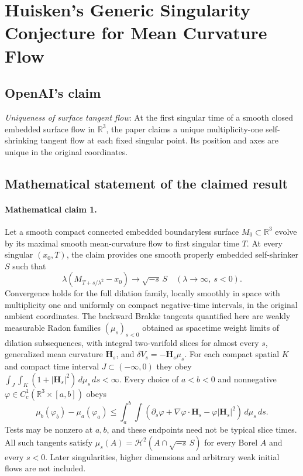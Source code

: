 \documentclass[11pt]{article}
\begin{document}
\section*{Huisken's Generic Singularity Conjecture for Mean Curvature Flow}

\subsection{OpenAI's claim}
\textit{Uniqueness of surface tangent flow}: At the first singular time of a smooth closed embedded surface flow in $\mathbb R^3$, the paper claims a unique multiplicity-one self-shrinking tangent flow at each fixed singular point. Its position and axes are unique in the original coordinates.

\subsection{Mathematical statement of the claimed result}
\paragraph{Mathematical claim 1.} Let a smooth compact connected embedded boundaryless surface $M_0\subset\mathbb R^3$ evolve by its maximal smooth mean-curvature flow to first singular time $T$. At every singular $(x_0,T)$, the claim provides one smooth properly embedded self-shrinker $S$ such that \[\lambda(M_{T+s/\lambda^2}-x_0)\longrightarrow\sqrt{-s}\,S\quad(\lambda\to\infty,\ s<0).\] Convergence holds for the full dilation family, locally smoothly in space with multiplicity one and uniformly on compact negative-time intervals, in the original ambient coordinates. The backward Brakke tangents quantified here are weakly measurable Radon families $(\mu_s)_{s<0}$ obtained as spacetime weight limits of dilation subsequences, with integral two-varifold slices for almost every $s$, generalized mean curvature $\mathbf H_s$, and $\delta V_s=-\mathbf H_s\mu_s$. For each compact spatial $K$ and compact time interval $J\subset(-\infty,0)$ they obey $\int_J\int_K(1+|\mathbf H_s|^2)\,d\mu_s\,ds<\infty$. Every choice of $a<b<0$ and nonnegative $\varphi\in C_c^1(\mathbb R^3\times[a,b])$ obeys \[\mu_b(\varphi_b)-\mu_a(\varphi_a)\le\int_a^b\int(\partial_s\varphi+\nabla\varphi\cdot\mathbf H_s-\varphi|\mathbf H_s|^2)\,d\mu_s\,ds.\] Tests may be nonzero at $a,b$, and these endpoints need not be typical slice times. All such tangents satisfy $\mu_s(A)=\mathcal H^2(A\cap\sqrt{-s}\,S)$ for every Borel $A$ and every $s<0$. Later singularities, higher dimensions and arbitrary weak initial flows are not included.
\end{document}
